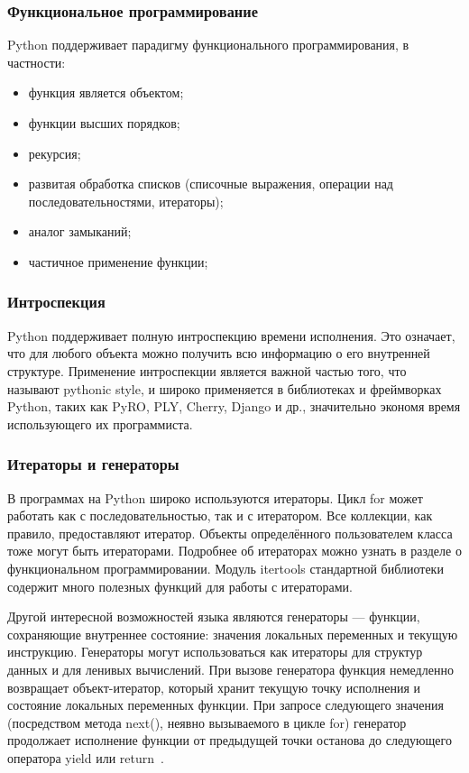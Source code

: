\subsubsection{Функциональное программирование}
Python поддерживает парадигму функционального программирования, в частности:
\begin{itemize}
\item функция является объектом;
\item функции высших порядков;
\item рекурсия;
\item развитая обработка списков (списочные выражения, операции над последовательностями, итераторы);
\item аналог замыканий;
\item частичное применение функции;
\end{itemize}

\subsubsection{Интроспекция}
Python поддерживает полную интроспекцию времени исполнения. Это означает, что для любого объекта можно получить всю информацию о его внутренней структуре.
Применение интроспекции является важной частью того, что называют pythonic style, и широко применяется в библиотеках и фреймворках Python, таких как PyRO, PLY, Cherry, Django и др., значительно экономя время использующего их программиста.

\subsubsection{Итераторы и генераторы}
В программах на Python широко используются итераторы. Цикл for может работать как с последовательностью, так и с итератором. Все коллекции, как правило, предоставляют итератор. Объекты определённого пользователем класса тоже могут быть итераторами. Подробнее об итераторах можно узнать в разделе о функциональном программировании. Модуль itertools стандартной библиотеки содержит много полезных функций для работы с итераторами.

Другой интересной возможностей языка являются генераторы — функции, сохраняющие внутреннее состояние: значения локальных переменных и текущую инструкцию. Генераторы могут использоваться как итераторы для структур данных и для ленивых вычислений.
При вызове генератора функция немедленно возвращает объект-итератор, который хранит текущую точку исполнения и состояние локальных переменных функции. При запросе следующего значения (посредством метода next(), неявно вызываемого в цикле for) генератор продолжает исполнение функции от предыдущей точки останова до следующего оператора yield или return~\cite{dive_into_python}.


